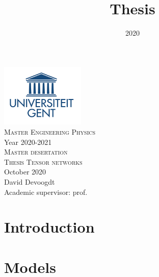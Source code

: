\documentclass{article}
\title{Thesis}
\date{2020}
\begin{document}



\onecolumn
\begin{titlepage}
    \begin{center}

        \includegraphics[width=4cm]{Figuren/UGent.png} \\[0.5cm]    %

        \Large{\textsc{Master Engineering Physics}} \\[0.5cm]  %

        \normalsize{Year 2020-2021} \\[3cm]  %

        \huge{\textsc{Master desertation}} \\[0.25cm]   %

        \Large{\textsc{Thesis Tensor networks}}\\[0.25cm]

        \large \textnormal{October 2020} \\[2.5cm]   %


        David Devoogdt \\       [2.5cm]


        Academic supervisor: prof.




        \vfill

    \end{center}
\end{titlepage}

\tableofcontents

\newpage
\listoftodos
\newpage

{}



\section{Introduction}


\section{Models}

\end{document}
